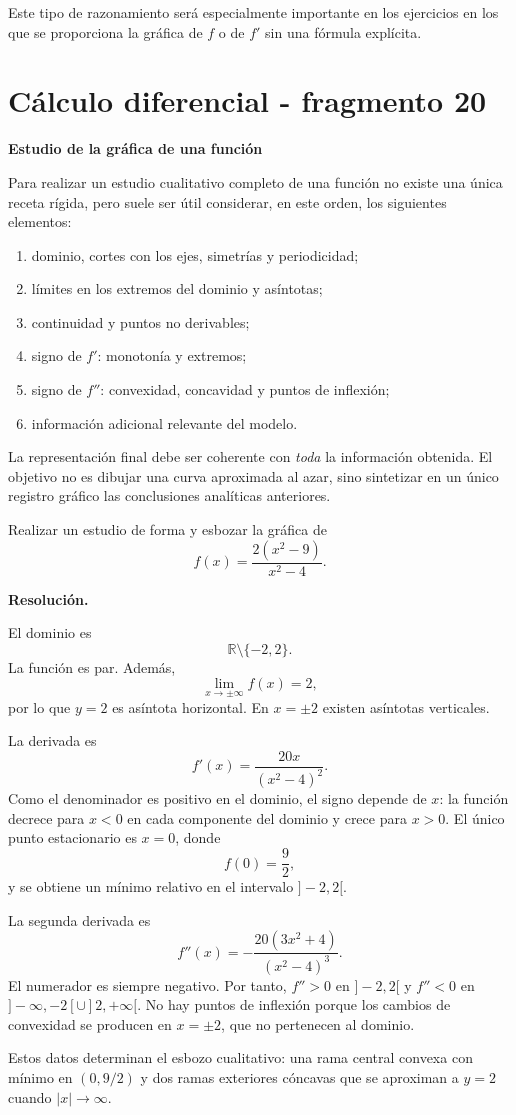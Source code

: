 Este tipo de razonamiento será especialmente importante en los ejercicios en los que se proporciona la gráfica de $f$ o de $f'$ sin una fórmula explícita.


\section{Cálculo diferencial - fragmento 20}
\textbf{Estudio de la gráfica de una función}

Para realizar un estudio cualitativo completo de una función no existe una única receta rígida, pero suele ser útil considerar, en este orden, los siguientes elementos:
\begin{enumerate}
\item dominio, cortes con los ejes, simetrías y periodicidad;
\item límites en los extremos del dominio y asíntotas;
\item continuidad y puntos no derivables;
\item signo de $f'$: monotonía y extremos;
\item signo de $f''$: convexidad, concavidad y puntos de inflexión;
\item información adicional relevante del modelo.
\end{enumerate}

La representación final debe ser coherente con \emph{toda} la información obtenida. El objetivo no es dibujar una curva aproximada al azar, sino sintetizar en un único registro gráfico las conclusiones analíticas anteriores.

\begin{solvedexercise}
Realizar un estudio de forma y esbozar la gráfica de
\[
f(x)=\frac{2(x^2-9)}{x^2-4}.
\]

\textbf{Resolución.}\par\smallskip
El dominio es
\[
\mathbb{R}\setminus\{-2,2\}.
\]
La función es par. Además,
\[
\lim_{x\to\pm\infty}f(x)=2,
\]
por lo que $y=2$ es asíntota horizontal. En $x=\pm2$ existen asíntotas verticales.

La derivada es
\[
f'(x)=\frac{20x}{(x^2-4)^2}.
\]
Como el denominador es positivo en el dominio, el signo depende de $x$: la función decrece para $x<0$ en cada componente del dominio y crece para $x>0$. El único punto estacionario es $x=0$, donde
\[
f(0)=\frac92,
\]
y se obtiene un mínimo relativo en el intervalo $]-2,2[$.

La segunda derivada es
\[
f''(x)=-\frac{20(3x^2+4)}{(x^2-4)^3}.
\]
El numerador es siempre negativo. Por tanto, $f''>0$ en $]-2,2[$ y $f''<0$ en $]-\infty,-2[\cup]2,+\infty[$. No hay puntos de inflexión porque los cambios de convexidad se producen en $x=\pm2$, que no pertenecen al dominio.

Estos datos determinan el esbozo cualitativo: una rama central convexa con mínimo en $(0,9/2)$ y dos ramas exteriores cóncavas que se aproximan a $y=2$ cuando $|x|\to\infty$.
\end{solvedexercise}


